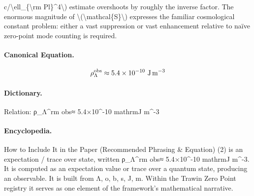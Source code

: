 c/\textbackslash{}ell\_\{\textbackslash{}rm Pl\}\textasciicircum{}4\textbackslash{}) estimate overshoots by roughly the inverse factor. The enormous magnitude of \textbackslash{}(\textbackslash{}mathcal\{S\}\textbackslash{}) expresses the familiar cosmological constant problem: either a vast suppression or vast enhancement relative to naïve zero-point mode counting is required.

\paragraph{Canonical Equation.}
\[
\rho_\Lambda^{\rm obs}\approx 5.4\times10^{-10}\ \mathrm{J\,m^{-3}}
\]

\paragraph{Dictionary.}
Relation: ρ\_Λ\textasciicircum{}rm obs≈ 5.4×10\textasciicircum{}-10 mathrmJ m\textasciicircum{}-3

\paragraph{Encyclopedia.}
How to Include It in the Paper (Recommended Phrasing \& Equation) (2) is an expectation / trace over state, written ρ\_Λ\textasciicircum{}rm obs≈ 5.4×10\textasciicircum{}-10 mathrmJ m\textasciicircum{}-3. It is computed as an expectation value or trace over a quantum state, producing an observable. It is built from Λ, o, b, s, J, m. Within the Trawin Zero Point registry it serves as one element of the framework's mathematical narrative.
